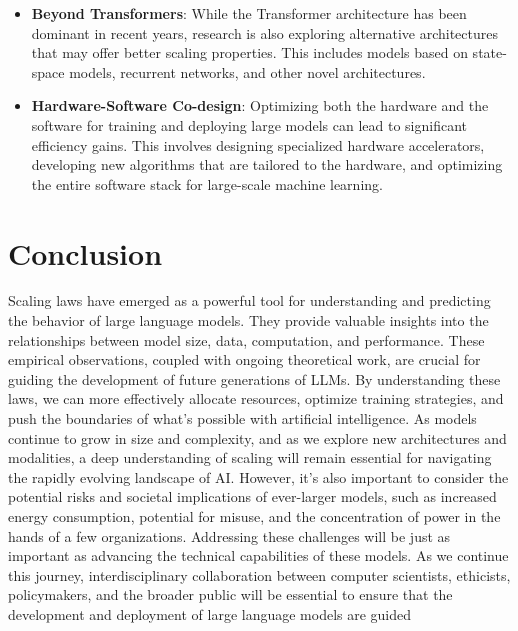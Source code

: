 \begin{itemize}
    \item \textbf{Beyond Transformers}: While the Transformer architecture has been dominant in recent years, research is also exploring alternative architectures that may offer better scaling properties. This includes models based on state-space models, recurrent networks, and other novel architectures.
    \item \textbf{Hardware-Software Co-design}: Optimizing both the hardware and the software for training and deploying large models can lead to significant efficiency gains. This involves designing specialized hardware accelerators, developing new algorithms that are tailored to the hardware, and optimizing the entire software stack for large-scale machine learning.
\end{itemize}

\section{Conclusion}
\label{sec:conclusion}

Scaling laws have emerged as a powerful tool for understanding and predicting the behavior of large language models. They provide valuable insights into the relationships between model size, data, computation, and performance. These empirical observations, coupled with ongoing theoretical work, are crucial for guiding the development of future generations of LLMs. By understanding these laws, we can more effectively allocate resources, optimize training strategies, and push the boundaries of what's possible with artificial intelligence. As models continue to grow in size and complexity, and as we explore new architectures and modalities, a deep understanding of scaling will remain essential for navigating the rapidly evolving landscape of AI. However, it's also important to consider the potential risks and societal implications of ever-larger models, such as increased energy consumption, potential for misuse, and the concentration of power in the hands of a few organizations. Addressing these challenges will be just as important as advancing the technical capabilities of these models. As we continue this journey, interdisciplinary collaboration between computer scientists, ethicists, policymakers, and the broader public will be essential to ensure that the development and deployment of large language models are guided